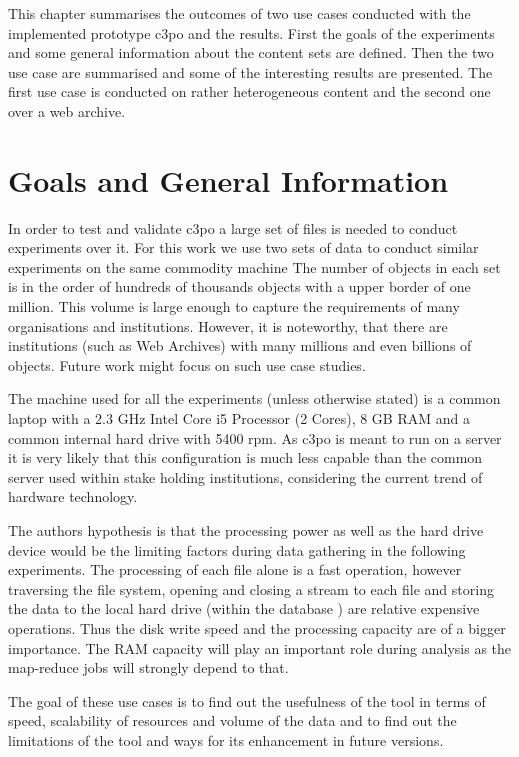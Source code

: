 This chapter summarises the outcomes of two use cases conducted with the implemented prototype c3po and the results.
First the goals of the experiments and some general information about the content sets are defined.
Then the two use case are summarised and some of the interesting results are presented.
The first use case is conducted on rather heterogeneous content and the second one over a web archive.

\section{Goals and General Information}
In order to test and validate c3po a large set of files is needed to conduct experiments over it.
For this work we use two sets of data to conduct similar experiments on the same commodity machine
The number of objects in each set is in the order of hundreds of thousands objects with a upper border of one million.
This volume is large enough to capture the requirements of many organisations and institutions.
However, it is noteworthy, that there are institutions (such as Web Archives) with many millions and even billions of objects.
Future work might focus on such use case studies.

The machine used for all the experiments (unless otherwise stated) is a common laptop with a 2.3 GHz Intel Core i5 Processor (2 Cores), 8 GB RAM and a common internal hard drive with 5400 rpm.
As c3po is meant to run on a server it is very likely that this configuration is much less capable than the common server used within stake holding institutions, considering the current trend of hardware technology.

The authors hypothesis is that the processing power as well as the hard drive device would be the limiting factors during data gathering in the following experiments.
The  processing of each file alone is a fast operation, however traversing the file system, opening and closing a stream to each file and storing the data to the local hard drive (within the database ) are relative expensive operations.
Thus the disk write speed and the processing capacity are of a bigger importance.
The RAM capacity will play an important role during analysis as the map-reduce jobs will strongly depend to that.

The goal of these use cases is to find out the usefulness of the tool in terms of speed, scalability of resources and volume of the data and to find out the limitations of the tool and ways for its enhancement in future versions.

